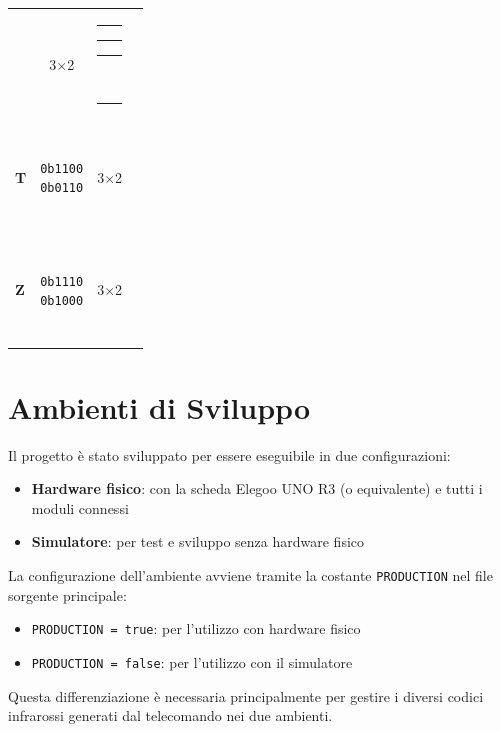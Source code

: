 \documentclass[a4paper, 12pt]{article}
\newcommand{\RedBlock}{\colorbox{red}{\rule{1.2ex}{1.2ex}}}      %
\newcommand{\WhiteBlock}{\fcolorbox{black}{white}{\rule{1.2ex}{1.2ex}}} %
\begin{document}
\begin{table}[H]
\begin{tabular}{
            >{\bfseries}l   %
            c               %
            c               %
            l               %
        }
              & 3\(\times\)2
              & \makecell{\WhiteBlock\RedBlock\RedBlock\RedBlock                          \\\WhiteBlock\WhiteBlock\RedBlock\WhiteBlock} \\
        \addlinespace
        T     & \makecell{\texttt{0b1100}                                                 \\\texttt{0b0110}}
              & 3\(\times\)2
              & \makecell{\RedBlock\RedBlock\WhiteBlock\WhiteBlock                        \\\WhiteBlock\RedBlock\RedBlock\WhiteBlock} \\
        \addlinespace
        Z     & \makecell{\texttt{0b1110}                                                 \\\texttt{0b1000}}
              & 3\(\times\)2
              & \makecell{\RedBlock\RedBlock\RedBlock\WhiteBlock                          \\\RedBlock\WhiteBlock\WhiteBlock\WhiteBlock} \\
        \bottomrule
    \end{tabular}
\end{table}

\section{Ambienti di Sviluppo}
\label{sec:ambienti}
Il progetto è stato sviluppato per essere eseguibile in due configurazioni:
\begin{itemize}
    \item \textbf{Hardware fisico}: con la scheda Elegoo UNO R3 (o equivalente) e tutti i moduli connessi
    \item \textbf{Simulatore}: per test e sviluppo senza hardware fisico
\end{itemize}

La configurazione dell'ambiente avviene tramite la costante \texttt{PRODUCTION} nel file sorgente principale:
\begin{itemize}
    \item \texttt{PRODUCTION = true}: per l'utilizzo con hardware fisico
    \item \texttt{PRODUCTION = false}: per l'utilizzo con il simulatore
\end{itemize}

Questa differenziazione è necessaria principalmente per gestire i diversi codici infrarossi generati dal telecomando nei due ambienti.
\end{document}
